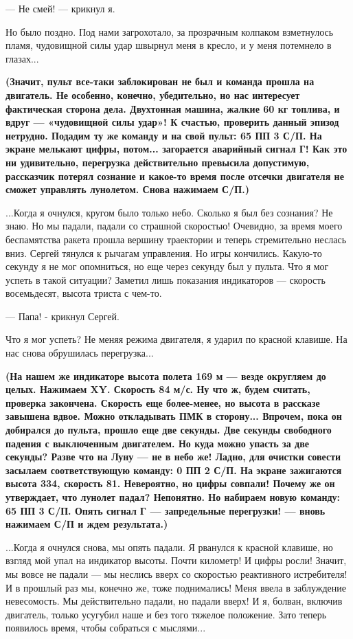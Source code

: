 \documentclass[11pt,a4paper,oneside]{article}
\begin{document}
— Не смей! — крикнул я.

Но было поздно. Под нами загрохотало, за прозрачным колпаком взметнулось пламя, чудовищной силы удар швырнул меня в кресло, и у меня потемнело в глазах...

\textbf{
(Значит, пульт все-таки заблокирован не был и команда прошла на двигатель. Не особенно, конечно, убедительно, но нас интересует фактическая сторона дела. Двухтонная машина, жалкие 60 кг топлива, и вдруг — «чудовищной силы удар»! К счастью, проверить данный эпизод нетрудно. Подадим ту же команду и на свой пульт: 65 ПП 3 С/П. На экране мелькают цифры, потом... загорается аварийный сигнал Г! Как это ни удивительно, перегрузка действительно превысила допустимую, рассказчик потерял сознание и какое-то время после отсечки двигателя не сможет управлять лунолетом. Снова нажимаем С/П.)
}

...Когда я очнулся, кругом было только небо. Сколько я был без сознания? Не знаю. Но мы падали, падали со страшной скоростью! Очевидно, за время моего беспамятства ракета прошла вершину траектории и теперь стремительно неслась вниз. Сергей тянулся к рычагам управления. Но игры кончились. Какую-то секунду я не мог опомниться, но еще через секунду был у пульта. Что я мог успеть в такой ситуации? Заметил лишь показания индикаторов — скорость восемьдесят, высота триста с чем-то.

— Папа! - крикнул Сергей.

Что я мог успеть? Не меняя режима двигателя, я ударил по красной клавише. На нас снова обрушилась перегрузка...

\textbf{
(На нашем же индикаторе высота полета 169 м — везде округляем до целых. Нажимаем XY. Скорость 84 м/с. Ну что ж, будем считать, проверка закончена. Скорость еще более-менее, но высота в рассказе завышена вдвое. Можно откладывать ПМК в сторону... Впрочем, пока он добирался до пульта, прошло еще две секунды. Две секунды свободного падения с выключенным двигателем. Но куда можно упасть за две секунды? Разве что на Луну — не в небо же! Ладно, для очистки совести засылаем соответствующую команду: 0 ПП 2 С/П. На экране зажигаются высота 334, скорость 81. Невероятно, но цифры совпали! Почему же он утверждает, что лунолет падал? Непонятно. Но набираем новую команду: 65 ПП 3 С/П. Опять сигнал Г — запредельные перегрузки! — вновь нажимаем С/П и ждем результата.)}

...Когда я очнулся снова, мы опять падали. Я рванулся к красной клавише, но взгляд мой упал на индикатор высоты. Почти километр! И цифры росли! Значит, мы вовсе не падали — мы неслись вверх со скоростью реактивного истребителя! И в прошлый раз мы, конечно же, тоже поднимались! Меня ввела в заблуждение невесомость. Мы действительно падали, но падали вверх! И я, болван, включив двигатель, только усугубил наше и без того тяжелое положение. Зато теперь появилось время, чтобы собраться с мыслями...
\end{document}
